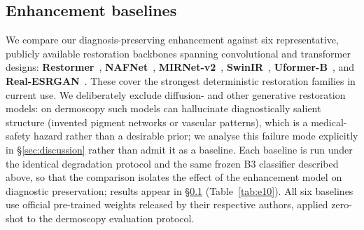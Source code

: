 \subsection{Enhancement baselines}
\label{subsec:setup-baselines}

We compare our diagnosis-preserving enhancement against six representative,
publicly available restoration backbones spanning convolutional and transformer
designs: \textbf{Restormer}~\citep{zamir2022restormer},
\textbf{NAFNet}~\citep{chen2022simple},
\textbf{MIRNet-v2}~\citep{zamir2022mirnetv2},
\textbf{SwinIR}~\citep{liang2021swinir},
\textbf{Uformer-B}~\citep{wang2022uformer}, and
\textbf{Real-ESRGAN}~\citep{wang2021realesrgan}. These cover the strongest
deterministic restoration families in current use. We deliberately exclude
diffusion- and other generative restoration models: on dermoscopy such models
can hallucinate diagnostically salient structure (invented pigment networks or
vascular patterns), which is a medical-safety hazard rather than a desirable
prior; we analyse this failure mode explicitly in \S\ref{sec:discussion} rather
than admit it as a baseline. Each baseline is run under the identical degradation
protocol and the same frozen B3 classifier described above, so that the
comparison isolates the effect of the enhancement model on diagnostic
preservation; results appear in \S\ref{subsec:setup-baselines}
(Table~\ref{tab:e10}). All six baselines use official pre-trained weights
released by their respective authors, applied zero-shot to the dermoscopy
evaluation protocol.
